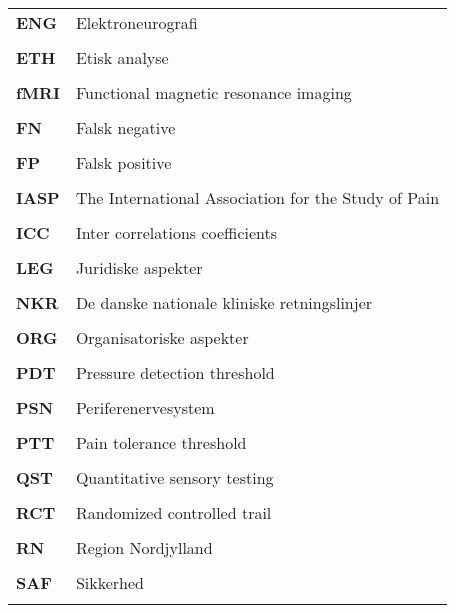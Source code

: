 \begin{longtable}{p{}  p{}}
\textbf{ENG} & Elektroneurografi                                         
\\ \\
\textbf{ETH} & Etisk analyse                                            
\\ \\
\textbf{fMRI}& Functional magnetic resonance imaging                    
\\ \\
\textbf{FN}  & Falsk negative                                           
\\ \\
\textbf{FP}  & Falsk positive                                           
\\ \\
\textbf{IASP}& The International Association for the Study of Pain      
\\ \\
\textbf{ICC} & Inter correlations coefficients                          
\\ \\
\textbf{LEG} & Juridiske aspekter                                       
\\ \\
\textbf{NKR} & De danske nationale kliniske retningslinjer              
\\ \\
\textbf{ORG} & Organisatoriske aspekter                                 
\\ \\
\textbf{PDT} & Pressure detection threshold                             
\\ \\
\textbf{PSN} & Periferenervesystem                                      
\\ \\
\textbf{PTT} & Pain tolerance threshold                                 
\\ \\
\textbf{QST} & Quantitative sensory testing                             
\\ \\
\textbf{RCT} & Randomized controlled trail
\\ \\
\textbf{RN}  & Region Nordjylland                                             
\\ \\
\textbf{SAF} & Sikkerhed                                                
\\ \\

\end{longtable}
